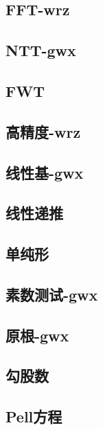 \documentclass[titlepage,a4paper,10pt]{article}
\begin{document}
\begin{multicols}{2}
\begin{spacing}{0.8}
			\subsection{FFT-wrz}
				
			\subsection{NTT-gwx}
				
			\subsection{FWT}
				
			\subsection{高精度-wrz}
				
			\subsection{线性基-gwx}
				
			\subsection{线性递推}
				
			\subsection{单纯形}
				
			\subsection{素数测试-gwx}
				
			\subsection{原根-gwx}
				
			\subsection{勾股数}
				
			\subsection{Pell方程}
				

\end{spacing}
\end{multicols}
\end{document}
